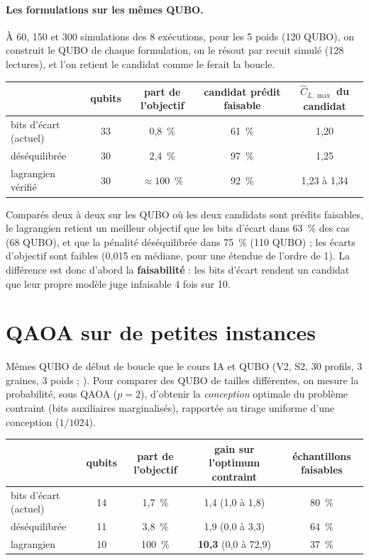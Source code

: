 \paragraph{Les formulations sur les mêmes QUBO.} À 60, 150 et 300 simulations des 8 exécutions, pour les 5 poids (120 QUBO), on construit le QUBO de chaque formulation, on le résout par recuit simulé (128 lectures), et l'on retient le candidat comme le ferait la boucle.
\begin{center}
\renewcommand{\arraystretch}{1.2}
\small
\begin{tabular}{lcccc}
\toprule
& qubits & part de l'objectif & candidat prédit faisable & $\hat C_{L,\max}$ du candidat \\
\midrule
bits d'écart (actuel) & 33 & 0,8~\% & 61~\% & 1,20 \\
déséquilibrée & 30 & 2,4~\% & 97~\% & 1,25 \\
lagrangien vérifié & 30 & $\approx100$~\% & 92~\% & 1,23 à 1,34 \\
\bottomrule
\end{tabular}
\end{center}
Comparés deux à deux sur les QUBO où les deux candidats sont prédits faisables, le lagrangien retient un meilleur objectif que les bits d'écart dans 63~\% des cas (68 QUBO), et que la pénalité déséquilibrée dans 75~\% (110 QUBO) ; les écarts d'objectif sont faibles (0,015 en médiane, pour une étendue de l'ordre de 1). La différence est donc d'abord la \textbf{faisabilité} : les bits d'écart rendent un candidat que leur propre modèle juge infaisable 4 fois sur 10.

\section{QAOA sur de petites instances}
Mêmes QUBO de début de boucle que le cours IA et QUBO (V2, S2, 30 profils, 3 graines, 3 poids ; ). Pour comparer des QUBO de tailles différentes, on mesure la probabilité, sous QAOA ($p=2$), d'obtenir la \emph{conception} optimale du problème contraint (bits auxiliaires marginalisés), rapportée au tirage uniforme d'une conception ($1/1024$).
\begin{center}
\renewcommand{\arraystretch}{1.2}
\small
\begin{tabular}{lcccc}
\toprule
& qubits & part de l'objectif & gain sur l'optimum contraint & échantillons faisables \\
\midrule
bits d'écart (actuel) & 14 & 1,7~\% & 1,4 (1,0 à 1,8) & 80~\% \\
déséquilibrée & 11 & 3,8~\% & 1,9 (0,0 à 3,3) & 64~\% \\
lagrangien & 10 & 100~\% & \textbf{10,3} (0,0 à 72,9) & 37~\% \\
\bottomrule
\end{tabular}
\end{center}
